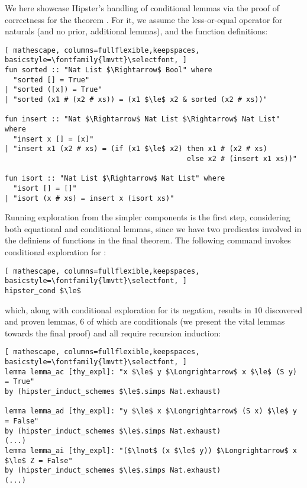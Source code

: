 We here showcase Hipster's handling of conditional lemmas via the proof of correctness for the theorem .
%
For it, we assume the less-or-equal operator \isaCode{$\le$} for naturals (and no prior, additional lemmas), and the function definitions:

\begin{lstlisting}[ mathescape, columns=fullflexible,keepspaces, basicstyle=\fontfamily{lmvtt}\selectfont, ]
fun sorted :: "Nat List $\Rightarrow$ Bool" where
  "sorted [] = True"
| "sorted ([x]) = True"
| "sorted (x1 # (x2 # xs)) = (x1 $\le$ x2 & sorted (x2 # xs))"

fun insert :: "Nat $\Rightarrow$ Nat List $\Rightarrow$ Nat List" where
  "insert x [] = [x]"
| "insert x1 (x2 # xs) = (if (x1 $\le$ x2) then x1 # (x2 # xs)	
                                           else x2 # (insert x1 xs))"

fun isort :: "Nat List $\Rightarrow$ Nat List" where
  "isort [] = []"
| "isort (x # xs) = insert x (isort xs)"
\end{lstlisting}

Running exploration from the simpler components is the first step, considering both equational and conditional lemmas, since we have two predicates involved in the definiens of functions in the final theorem.
%
The following command invokes conditional exploration for \isaCode{$\le$}:

\begin{lstlisting}[ mathescape, columns=fullflexible,keepspaces, basicstyle=\fontfamily{lmvtt}\selectfont, ]
hipster_cond $\le$
\end{lstlisting}

\noindent which, along with conditional exploration for its negation, results in $10$ discovered and proven lemmas, $6$ of which are conditionals (we present the vital lemmas towards the final proof) and all require recursion induction:

\begin{lstlisting}[ mathescape, columns=fullflexible,keepspaces, basicstyle=\fontfamily{lmvtt}\selectfont, ]
lemma lemma_ac [thy_expl]: "x $\le$ y $\Longrightarrow$ x $\le$ (S y) = True"
by (hipster_induct_schemes $\le$.simps Nat.exhaust)

lemma lemma_ad [thy_expl]: "y $\le$ x $\Longrightarrow$ (S x) $\le$ y = False"
by (hipster_induct_schemes $\le$.simps Nat.exhaust)
(...)
lemma lemma_ai [thy_expl]: "($\lnot$ (x $\le$ y)) $\Longrightarrow$ x $\le$ Z = False"
by (hipster_induct_schemes $\le$.simps Nat.exhaust)
(...)
\end{lstlisting}

